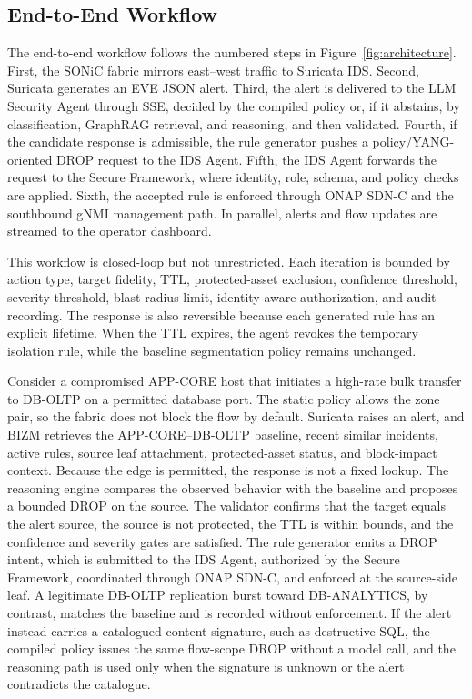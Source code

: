 \documentclass[final,5p]{elsarticle}
\begin{document}
\subsection{End-to-End Workflow}
\label{sec:e2e_workflow}

The end-to-end workflow follows the numbered steps in Figure~\ref{fig:architecture}. First, the SONiC fabric mirrors east--west traffic to Suricata IDS. Second, Suricata generates an EVE JSON alert. Third, the alert is delivered to the LLM Security Agent through SSE, decided by the compiled policy or, if it abstains, by classification, GraphRAG retrieval, and reasoning, and then validated. Fourth, if the candidate response is admissible, the rule generator pushes a policy/YANG-oriented DROP request to the IDS Agent. Fifth, the IDS Agent forwards the request to the Secure Framework, where identity, role, schema, and policy checks are applied. Sixth, the accepted rule is enforced through ONAP SDN-C and the southbound gNMI management path. In parallel, alerts and flow updates are streamed to the operator dashboard.

This workflow is closed-loop but not unrestricted. Each iteration is bounded by action type, target fidelity, TTL, protected-asset exclusion, confidence threshold, severity threshold, blast-radius limit, identity-aware authorization, and audit recording. The response is also reversible because each generated rule has an explicit lifetime. When the TTL expires, the agent revokes the temporary isolation rule, while the baseline segmentation policy remains unchanged.

Consider a compromised APP-CORE host that initiates a high-rate bulk transfer to DB-OLTP on a permitted database port. The static policy allows the zone pair, so the fabric does not block the flow by default. Suricata raises an alert, and BIZM retrieves the APP-CORE--DB-OLTP baseline, recent similar incidents, active rules, source leaf attachment, protected-asset status, and block-impact context. Because the edge is permitted, the response is not a fixed lookup. The reasoning engine compares the observed behavior with the baseline and proposes a bounded DROP on the source. The validator confirms that the target equals the alert source, the source is not protected, the TTL is within bounds, and the confidence and severity gates are satisfied. The rule generator emits a DROP intent, which is submitted to the IDS Agent, authorized by the Secure Framework, coordinated through ONAP SDN-C, and enforced at the source-side leaf. A legitimate DB-OLTP replication burst toward DB-ANALYTICS, by contrast, matches the baseline and is recorded without enforcement. If the alert instead carries a catalogued content signature, such as destructive SQL, the compiled policy issues the same flow-scope DROP without a model call, and the reasoning path is used only when the signature is unknown or the alert contradicts the catalogue.
\end{document}
